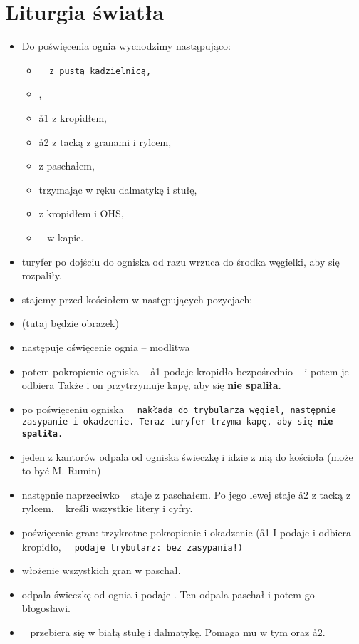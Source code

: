 \section{Liturgia światła}
	
	\begin{itemize}
		\item Do poświęcenia ognia wychodzimy nastąpująco:
		\begin{itemize}
			\item \tt~ z pustą kadzielnicą, 
			\item {},
			\item \aa1 z kropidłem, 
			\item \aa2 z tacką z granami i rylcem,
			\item {} z paschałem, 
			\item {} trzymając w ręku dalmatykę i stułę, 
			\item {} z kropidłem i OHS, 
			\item \ii~ w kapie.
		\end{itemize}
		\item turyfer po dojściu do ogniska od razu wrzuca do środka węgielki, aby się rozpaliły.
		\item stajemy przed kościołem w następujących pozycjach:
		\item (tutaj będzie obrazek)
		\item następuje oświęcenie ognia -- modlitwa
		\item potem pokropienie ogniska -- \aa1 podaje kropidło bezpośrednio \ii~ i potem je odbiera Także i on przytrzymuje kapę, aby się \textbf{nie spaliła}.
		\item po poświęceniu ogniska \tt~ nakłada do trybularza węgiel, następnie zasypanie i okadzenie. Teraz turyfer trzyma kapę, aby się \textbf{nie spaliła}.
		\item jeden z kantorów odpala od ogniska świeczkę i idzie z nią do kościoła (może to być M. Rumin)
		\item następnie naprzeciwko \ii~ staje \mm z paschałem. Po jego lewej staje \aa2 z
		tacką z rylcem. \ii~ kreśli wszystkie litery i cyfry.
		\item poświęcenie gran: trzykrotne pokropienie i okadzenie (\aa1 I podaje i odbiera kropidło, \tt~ podaje trybularz: bez zasypania!)
		\item włożenie wszystkich gran w paschał.
		\item {} odpala świeczkę od ognia i podaje \ii. Ten odpala paschał i potem go błogosławi.
		\item \ii~ przebiera się w białą stułę i dalmatykę. Pomaga mu w tym  oraz \aa2.

\end{itemize}
